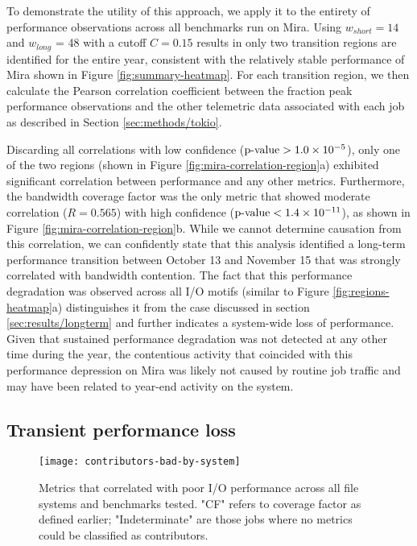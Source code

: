 To demonstrate the utility of this approach, we apply it to the entirety of performance observations across all benchmarks run on Mira.
Using $w_{short} = 14$ and $w_{long}$ = 48 with a cutoff $C = 0.15$ results in only two transition regions are identified for the entire year, consistent with the relatively stable performance of Mira shown in Figure \ref{fig:summary-heatmap}.
For each transition region, we then calculate the Pearson correlation coefficient between the fraction peak performance observations and the other telemetric data associated with each job as described in Section \ref{sec:methods/tokio}.

Discarding all correlations with low confidence ($\textup{p-value} > {1.0 \times 10^{-5}}$), only one of the two regions (shown in Figure \ref{fig:mira-correlation-region}a) exhibited significant correlation between performance and any other metrics.
Furthermore, the bandwidth coverage factor was the only metric that showed moderate correlation (${R = 0.565}$) with high confidence ($\textup{p-value} < 1.4 \times 10^{-11}$), as shown in Figure \ref{fig:mira-correlation-region}b.
While we cannot determine causation from this correlation, we can confidently state that this analysis identified a long-term performance transition between October 13 and November 15 that was strongly correlated with bandwidth contention.
The fact that this performance degradation was observed across all I/O motifs (similar to Figure \ref{fig:regions-heatmap}a) distinguishes it from the case discussed in section \ref{sec:results/longterm} and further indicates a system-wide loss of performance.
Given that sustained performance degradation was not detected at any other time during the year, the contentious activity that coincided with this performance depression on Mira was likely not caused by routine job traffic and may have been related to year-end activity on the system.







\subsection{Transient performance loss} \label{sec:results/shortterm}

\begin{figure}[t]
    \centering
    \texttt{[image: contributors-bad-by-system]}
    \vspace{-.35in}
    \caption{Metrics that correlated with poor I/O performance across all file systems and benchmarks tested.  "CF" refers to coverage factor as defined earlier; "Indeterminate" are those jobs where no metrics could be classified as contributors.
    }
    \label{fig:contributors-bad-by-system}
\end{figure}

